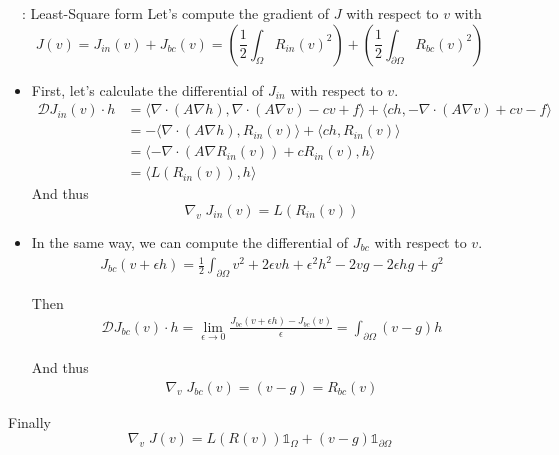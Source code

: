 \begin{frame}[allowframebreaks]{\appendixname~\theappendixframenumber~: Least-Square form}
	Let's compute the gradient of $J$ with respect to $v$ with
	\begin{equation*}
		J(v)=J_{in}(v)+J_{bc}(v)=\left(\frac{1}{2}\int_\Omega R_{in}(v)^2\right)+\left(\frac{1}{2}\int_{\partial\Omega} R_{bc}(v)^2\right)
	\end{equation*}
	\begin{itemize}[\textbullet]
		\item First, let's calculate the differential of $J_{in}$ with respect to $v$.
		\begin{align*}
			\mathcal{D}J_{in}(v)\cdot h &= \langle \nabla\cdot(A\nabla h), \nabla\cdot(A\nabla v) - cv +f \rangle+\langle ch, -\nabla\cdot(A\nabla v) + cv - f \rangle \\ 
			&= -\langle \nabla\cdot(A\nabla h), R_{in}(v) \rangle+\langle ch, R_{in}(v)\rangle \\ 
			&= \langle -\nabla\cdot(A\nabla R_{in}(v))+cR_{in}(v), h \rangle \\
			&= \langle L(R_{in}(v)), h \rangle
		\end{align*}
		And thus		
		\begin{equation*}
			\nabla_v \; J_{in}(v) = L(R_{in}(v))
		\end{equation*}
	
		\newpage
		
		\item In the same way, we can compute the differential of $J_{bc}$ with respect to $v$.
		\begin{align*}
			J_{bc}(v+\epsilon h)=\frac{1}{2} \int_{\partial\Omega} v^2+2\epsilon vh +\epsilon^2 h^2 - 2vg - 2\epsilon hg+g^2
		\end{align*}
		
		Then
		\begin{align*}
			\mathcal{D}J_{bc}(v)\cdot h =  \lim_{\epsilon\rightarrow 0}\frac{J_{bc}(v+\epsilon h)-J_{bc}(v)}{\epsilon} = \int_{\partial\Omega} (v-g)h
		\end{align*}
		
		And thus
		\begin{align*}
			\nabla_v \; J_{bc}(v) = (v-g) = R_{bc}(v) 
		\end{align*}
	\end{itemize}
	
	Finally
	\begin{equation*}
		\nabla_v \; J(v) = L(R(v))\mathds{1}_\Omega + (v-g)\mathds{1}_{\partial\Omega}
	\end{equation*}
	
\end{frame}
\addtocounter{appendixframenumber}{1}

